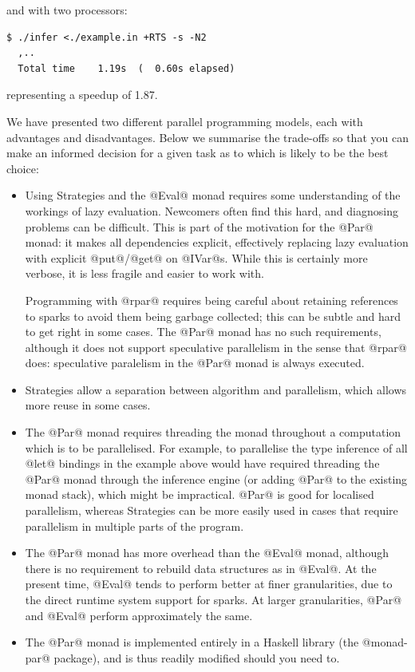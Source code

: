 \noindent and with two processors:

{\small \begin{verbatim}
$ ./infer <./example.in +RTS -s -N2
  ,..
  Total time    1.19s  (  0.60s elapsed)
\end{verbatim}}

\noindent representing a speedup of 1.87.


We have presented two different parallel programming models, each with
advantages and disadvantages.  Below we summarise the trade-offs so
that you can make an informed decision for a given task as to which is
likely to be the best choice:

\begin{itemize}
\item Using Strategies and the @Eval@ monad requires some
  understanding of the workings of lazy evaluation.  Newcomers often
  find this hard, and diagnosing problems can be difficult.  This is
  part of the motivation for the @Par@ monad: it makes all
  dependencies explicit, effectively replacing lazy evaluation with
  explicit @put@/@get@ on @IVar@s.  While this is certainly more
  verbose, it is less fragile and easier to work with.

  Programming with @rpar@ requires being careful about retaining
  references to sparks to avoid them being garbage collected; this can
  be subtle and hard to get right in some cases.  The @Par@ monad has
  no such requirements, although it does not support speculative
  parallelism in the sense that @rpar@ does: speculative paralelism
  in the @Par@ monad is always executed.

\item Strategies allow a separation between algorithm and parallelism,
  which allows more reuse in some cases.

\item The @Par@ monad requires threading the monad throughout a
  computation which is to be parallelised.  For example, to
  parallelise the type inference of all @let@ bindings in the example
  above would have required threading the @Par@ monad through the
  inference engine (or adding @Par@ to the existing monad stack),
  which might be impractical.  @Par@ is good for localised
  parallelism, whereas Strategies can be more easily used in cases
  that require parallelism in multiple parts of the program.

\item The @Par@ monad has more overhead than the @Eval@ monad,
  although there is no requirement to rebuild data structures as in
  @Eval@.  At the present time, @Eval@ tends to perform better at
  finer granularities, due to the direct runtime system support for
  sparks.  At larger granularities, @Par@ and @Eval@ perform
  approximately the same.

\item The @Par@ monad is implemented entirely in a Haskell library
  (the @monad-par@ package), and is thus readily modified should you
  need to.
\end{itemize}



